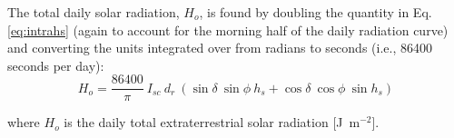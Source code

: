\noindent The total daily solar radiation, $H_o$, is found by doubling the quantity in Eq. \ref{eq:intrahs} (again to account for the morning half of the daily radiation curve) and converting the units integrated over from radians to seconds (i.e., 86400 seconds per day):
\begin{equation}
\label{eq:dayra}
	H_o = \frac{86400}{\pi}\: I_{sc}\: d_r\: \left( 
	      \sin\delta\: \sin\phi\: h_s + 
	      \cos\delta\: \cos\phi\: \sin h_s \right)
\end{equation}

\noindent where $H_o$ is the daily total extraterrestrial solar radiation [J~m$^{-2}$].

